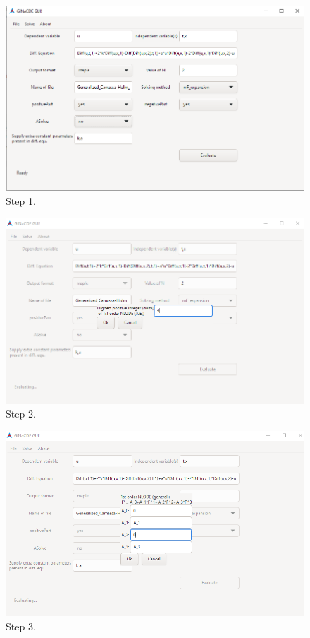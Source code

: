 \documentclass[11pt,a4paper,titlepage]{article}
\begin{document}
\begin{figure}[H]
	\centering
	\includegraphics[width=\linewidth]{Ex2step1}
	\caption{ Step 1. }
	\label{fig:Ex2step1}
\end{figure}

\begin{figure}[H]
	\centering
	\includegraphics[width=\linewidth]{Ex2step2}
	\caption{ Step 2. }
	\label{fig:Ex2step2}
\end{figure}

\begin{figure}[H]
	\centering
	\includegraphics[width=\linewidth]{Ex2step3}
	\caption{ Step 3. }
	\label{fig:Ex2step3}
\end{figure}
\end{document}

